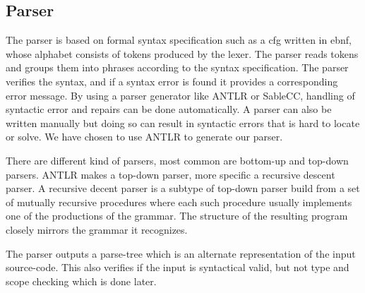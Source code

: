 \subsection*{Parser}
The parser is based on formal syntax specification such as a \acrfull{cfg} written in \acrfull{ebnf}, whose alphabet consists of tokens produced by the lexer. 
The parser reads tokens and groups them into phrases according to the syntax specification.
The parser verifies the syntax, and if a syntax error is found it provides a corresponding error message. \citep{Crafting_book}
By using a parser generator like ANTLR or SableCC, handling of syntactic error and repairs can be done automatically.
A parser can also be written manually but doing so can result in syntactic errors that is hard to locate or solve.
We have chosen to use ANTLR to generate our parser.

There are different kind of parsers, most common are bottom-up and top-down parsers.
ANTLR makes a top-down parser, more specific a recursive descent parser.
A recursive decent parser is a subtype of top-down parser build from a set of mutually recursive procedures where each such procedure usually implements one of the productions of the grammar.
The structure of the resulting program closely mirrors the grammar it recognizes. \citep{Recursive_programming}

The parser outputs a parse-tree which is an alternate representation of the input source-code. 
This also verifies if the input is syntactical valid, but not type and scope checking which is done later. 


